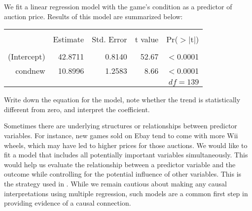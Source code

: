\begin{exercisewrap}
\begin{nexercise}
\label{condNewVarForMarioKartOnly}
We fit a linear regression model with
the game's condition as a predictor of auction price.
Results of this model are summarized below:
\begin{center}
\begin{tabular}{rrrrr}
  \hline
  \vspace{-3.7mm} & & & & \\
 & Estimate & Std. Error & t value & Pr($>$$|$t$|$) \\ 
  \hline
  \vspace{-3.8mm} & & & & \\
(Intercept) & 42.8711 & 0.8140 & 52.67 & $<$0.0001 \\ 
  cond\us{}new & 10.8996 & 1.2583 & 8.66 & $<$0.0001 \\ 
   \hline
   &&&\multicolumn{2}{r}{$df=139$}
\end{tabular}
\end{center}
Write down the equation for the model,
note whether the trend is statistically different from zero,
and interpret the coefficient.\footnotemark{}
\end{nexercise}
\end{exercisewrap}

Sometimes there are underlying structures or relationships between predictor variables. For instance, new games sold on Ebay tend to come with more Wii wheels, which may have led to higher prices for those auctions. We would like to fit a model that includes all potentially important variables simultaneously. This would help us evaluate the relationship between a predictor variable and the outcome while controlling for the potential influence of other variables. This is the strategy used in . While we remain cautious about making any causal interpretations using multiple regression, such models are a common first step in providing evidence of a causal connection.

